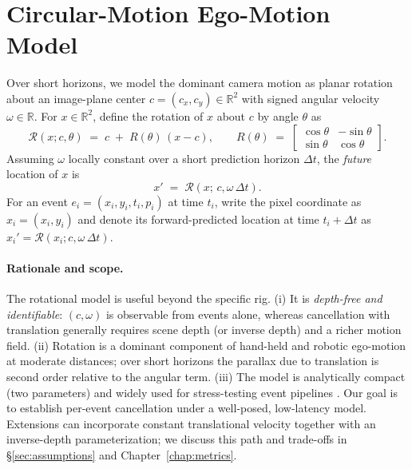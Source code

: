 \section{Circular-Motion Ego-Motion Model}
Over short horizons, we model the dominant camera motion as planar rotation about an image-plane center $c=(c_x,c_y) \in \mathbb{R}^2$ with signed angular velocity $\omega \in \mathbb{R}$. For $x \in \mathbb{R}^2$, define the rotation of $x$ about $c$ by angle $\theta$ as
\begin{equation}
\mathcal{R}(x; c, \theta) \;=\; c \;+\; R(\theta)\,(x-c),
\qquad
R(\theta) \;=\; 
\begin{bmatrix}\cos \theta & -\sin \theta\\ \sin \theta & \cos \theta\end{bmatrix}.
\label{eq:rot-operator}
\end{equation}
Assuming $\omega$ locally constant over a short prediction horizon $\Delta t$, the \emph{future} location of $x$ is
\begin{equation}
x' \;=\; \mathcal{R}\!\left(x;\, c, \omega\,\Delta t\right).
\label{eq:forward-prop}
\end{equation}
For an event $e_i=(x_i,y_i,t_i,p_i)$ at time $t_i$, write the pixel coordinate as $x_i=(x_i,y_i)$ and denote its forward-predicted location at time $t_i+\Delta t$ as $x_i' = \mathcal{R}(x_i; c, \omega\,\Delta t)$.

\paragraph{Rationale and scope.}
The rotational model is useful beyond the specific rig. (i) It is \emph{depth-free and identifiable}: $(c,\omega)$ is observable from events alone, whereas cancellation with translation generally requires scene depth (or inverse depth) and a richer motion field. (ii) Rotation is a dominant component of hand-held and robotic ego-motion at moderate distances; over short horizons the parallax due to translation is second order relative to the angular term. (iii) The model is analytically compact (two parameters) and widely used for stress-testing event pipelines \cite{Gallego2017Angular,Stoffregen2019Segmentation,Gallego2018CMax}. Our goal is to establish per-event cancellation under a well-posed, low-latency model. Extensions can incorporate constant translational velocity together with an inverse-depth parameterization; we discuss this path and trade-offs in \S\ref{sec:assumptions} and Chapter~\ref{chap:metrics}.

